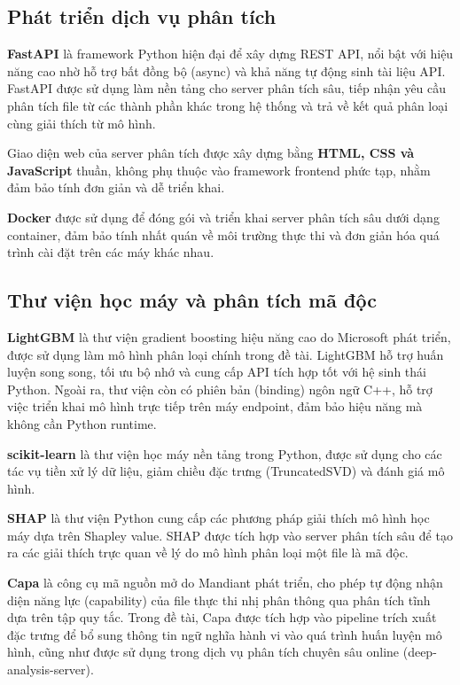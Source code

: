 \subsection{Phát triển dịch vụ phân tích}

\textbf{FastAPI} \cite{fastapi} là framework Python hiện đại để xây
dựng REST API, nổi bật với hiệu năng cao nhờ hỗ trợ bất đồng bộ
(async) và khả năng tự động sinh tài liệu API. FastAPI được sử dụng
làm nền tảng cho server phân tích sâu, tiếp nhận yêu cầu phân tích
file từ các thành phần khác trong hệ thống và trả về kết quả phân
loại cùng giải thích từ mô hình.

Giao diện web của server phân tích được xây dựng bằng \textbf{HTML,
CSS và JavaScript} thuần, không phụ thuộc vào framework frontend phức
tạp, nhằm đảm bảo tính đơn giản và dễ triển khai.

\textbf{Docker} \cite{docker} được sử dụng để đóng gói và triển khai
server phân tích sâu dưới dạng container, đảm bảo tính nhất quán về
môi trường thực thi và đơn giản hóa quá trình cài đặt trên các máy
khác nhau.

\subsection{Thư viện học máy và phân tích mã độc}

\textbf{LightGBM} \cite{lgbm} là thư viện gradient boosting hiệu năng
cao do Microsoft phát triển, được sử dụng làm mô hình phân loại chính
trong đề tài. LightGBM hỗ trợ huấn luyện song song, tối ưu bộ nhớ
và cung cấp API tích hợp tốt với hệ sinh thái Python. Ngoài ra, thư
viện còn có phiên bản (binding) ngôn ngữ C++, hỗ trợ việc triển
khai mô hình trực tiếp trên máy endpoint, đảm bảo hiệu năng mà
không cần Python runtime.

\textbf{scikit-learn} \cite{sklearn} là thư viện học máy nền tảng
trong Python, được sử dụng cho các tác vụ tiền xử lý dữ liệu, giảm
chiều đặc trưng (TruncatedSVD) và đánh giá mô hình.

\textbf{SHAP} \cite{shap} là thư viện Python cung cấp các phương pháp
giải thích mô hình học máy dựa trên Shapley value. SHAP được tích hợp
vào server phân tích sâu để tạo ra các giải thích trực quan về lý do
mô hình phân loại một file là mã độc.

\textbf{Capa} \cite{capa} là công cụ mã nguồn mở do Mandiant phát
triển, cho phép tự động nhận diện năng lực (capability) của file thực
thi nhị phân thông qua phân tích tĩnh dựa trên tập quy tắc. Trong đề
tài, Capa được tích hợp vào pipeline trích xuất đặc trưng để bổ sung
thông tin ngữ nghĩa hành vi vào quá trình huấn luyện mô hình, cũng
như được sử dụng trong dịch vụ phân tích chuyên sâu online
(deep-analysis-server).
